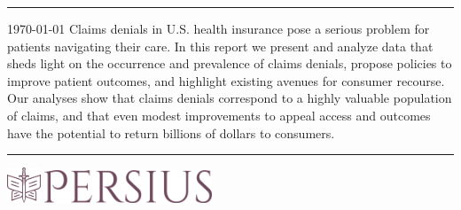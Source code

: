 \documentclass[12pt, a4paper,twoside,parskip=full]{report}
\theoremstyle{plain} %
\theoremstyle{definition} %
\theoremstyle{remark} %
\numberwithin{equation}{chapter}
\begin{document}
		
		
		\thispagestyle{empty} %
		
		\noindent
		\begin{minipage}{0.1\textwidth}
		\end{minipage}
		\hfill
		
		\begin{center}
			\noindent\textcolor{primaryc}{\rule{\linewidth}{4.8pt}}
			
			\vspace{2em}
			
			\vspace{3em}
			
			\vspace{3em}
			
			{\small \today }
			\vfill
			Claims denials in U.S. health insurance pose a serious problem for patients navigating their care. In this report we present and analyze data that sheds light on the occurrence and prevalence of claims denials, propose policies to improve patient outcomes, and highlight existing avenues for consumer recourse. Our analyses show that claims denials correspond to a highly valuable population
			of claims, and that even modest improvements to appeal access and outcomes
			have the potential to return billions of dollars to consumers.
			\vfill
			

			
			\vspace{0.5em}
			\noindent\textcolor{primaryc}{\rule{\linewidth}{4.8pt}}
			

			
			\vspace{3em}
			\includegraphics[width = 10mm]{images/persius/favicon.png}
			\hspace{2mm}
			\includegraphics[width = 50mm]{images/persius/persius_f1_maroon.png}\\[8ex]
		\end{center}
		
		\clearpage
		
		
\end{document}

